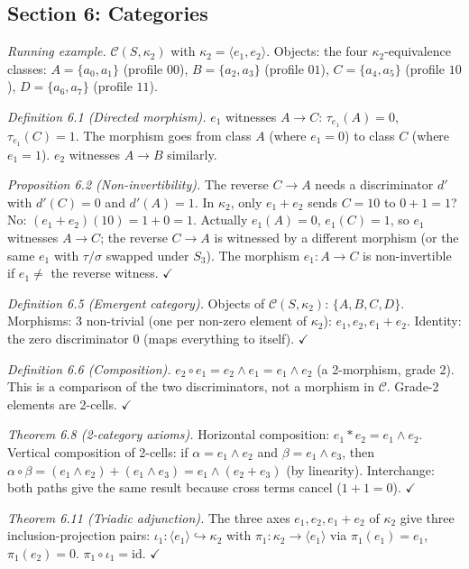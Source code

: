 \subsection{Section 6: Categories}

\emph{Running example.}
$\mathcal{C}(S, \kappa_2)$ with $\kappa_2 = \langle
e_1, e_2 \rangle$. Objects: the four $\kappa_2$-equivalence
classes:
$A = \{a_0, a_1\}$ (profile $00$),
$B = \{a_2, a_3\}$ (profile $01$),
$C = \{a_4, a_5\}$ (profile $10$),
$D = \{a_6, a_7\}$ (profile $11$).

\emph{Definition 6.1 (Directed morphism).}
$e_1$ witnesses $A \to C$: $\tau_{e_1}(A) = 0$,
$\tau_{e_1}(C) = 1$. The morphism goes from class $A$
(where $e_1 = 0$) to class $C$ (where $e_1 = 1$).
$e_2$ witnesses $A \to B$ similarly.

\emph{Proposition 6.2 (Non-invertibility).}
The reverse $C \to A$ needs a discriminator $d'$ with
$d'(C) = 0$ and $d'(A) = 1$. In $\kappa_2$, only
$e_1{+}e_2$ sends $C = 10$ to $0{+}1 = 1$? No:
$(e_1{+}e_2)(10) = 1+0 = 1$. Actually $e_1(A) = 0$,
$e_1(C) = 1$, so $e_1$ witnesses $A \to C$; the reverse
$C \to A$ is witnessed by a different morphism (or the
same $e_1$ with $\tau/\sigma$ swapped under $S_3$).
The morphism $e_1: A \to C$ is non-invertible if
$e_1 \neq$ the reverse witness. $\checkmark$

\emph{Definition 6.5 (Emergent category).}
Objects of $\mathcal{C}(S, \kappa_2)$: $\{A, B, C, D\}$.
Morphisms: 3 non-trivial (one per non-zero element of
$\kappa_2$): $e_1, e_2, e_1{+}e_2$.
Identity: the zero discriminator $0$ (maps everything
to itself). $\checkmark$

\emph{Definition 6.6 (Composition).}
$e_2 \circ e_1 = e_2 \wedge e_1 = e_1 \wedge e_2$
(a 2-morphism, grade 2). This is a comparison of the
two discriminators, not a morphism in $\mathcal{C}$.
Grade-2 elements are 2-cells. $\checkmark$

\emph{Theorem 6.8 (2-category axioms).}
Horizontal composition: $e_1 * e_2 = e_1 \wedge e_2$.
Vertical composition of 2-cells: if $\alpha = e_1
\wedge e_2$ and $\beta = e_1 \wedge e_3$, then
$\alpha \circ \beta = (e_1 \wedge e_2) + (e_1 \wedge
e_3) = e_1 \wedge (e_2 + e_3)$ (by linearity).
Interchange: both paths give the same result because
cross terms cancel ($1+1=0$). $\checkmark$

\emph{Theorem 6.11 (Triadic adjunction).}
The three axes $e_1, e_2, e_1{+}e_2$ of $\kappa_2$
give three inclusion-projection pairs:
$\iota_1: \langle e_1 \rangle \hookrightarrow \kappa_2$
with $\pi_1: \kappa_2 \to \langle e_1 \rangle$ via
$\pi_1(e_1) = e_1$, $\pi_1(e_2) = 0$.
$\pi_1 \circ \iota_1 = \mathrm{id}$. $\checkmark$

